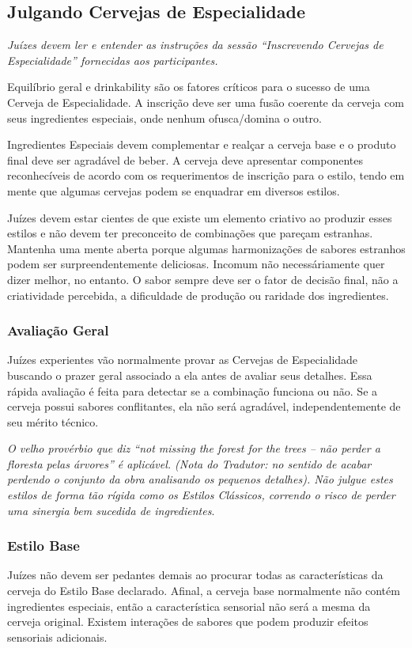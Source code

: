 \subsection*{Julgando Cervejas de Especialidade}
\textit{Juízes devem ler e entender as instruções da sessão “Inscrevendo Cervejas de Especialidade” fornecidas aos participantes.}

Equilíbrio geral e drinkability são os fatores críticos para o sucesso de uma Cerveja de Especialidade. A inscrição deve ser uma fusão coerente da cerveja com seus ingredientes especiais, onde nenhum ofusca/domina o outro.

Ingredientes Especiais devem complementar e realçar a cerveja base e o produto final deve ser agradável de beber. A cerveja deve apresentar componentes reconhecíveis de acordo com os requerimentos de inscrição para o estilo, tendo em mente que algumas cervejas podem se enquadrar em diversos estilos.

Juízes devem estar cientes de que existe um elemento criativo ao produzir esses estilos e não devem ter preconceito de combinações que pareçam estranhas. Mantenha uma mente aberta porque algumas harmonizações de sabores estranhos podem ser surpreendentemente deliciosas. Incomum não necessáriamente quer dizer melhor, no entanto. O sabor sempre deve ser o fator de decisão final, não a criatividade percebida, a dificuldade de produção ou raridade dos ingredientes.

\subsubsection*{Avaliação Geral}
Juízes experientes vão normalmente provar as Cervejas de Especialidade buscando o prazer geral associado a ela antes de avaliar seus detalhes. Essa rápida avaliação é feita para detectar se a combinação funciona ou não. Se a cerveja possui sabores conflitantes, ela não será agradável, independentemente de seu mérito técnico.

\textit{O velho provérbio que diz “not missing the forest for the trees – não perder a floresta pelas árvores” é aplicável. (Nota do Tradutor: no sentido de acabar perdendo o conjunto da obra analisando os pequenos detalhes). Não julgue estes estilos de forma tão rígida como os Estilos Clássicos, correndo o risco de perder uma sinergia bem sucedida de ingredientes}.

\subsubsection*{Estilo Base}
Juízes não devem ser pedantes demais ao procurar todas as características da cerveja do Estilo Base declarado. Afinal, a cerveja base normalmente não contém ingredientes especiais, então a característica sensorial não será a mesma da cerveja original. Existem interações de sabores que podem produzir efeitos sensoriais adicionais.

